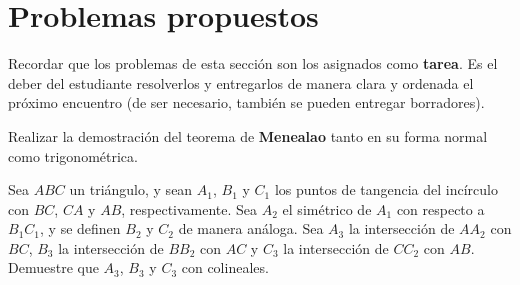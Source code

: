 \section{Problemas propuestos}

Recordar que los problemas de esta sección son los asignados como \textbf{tarea}.
Es el deber del estudiante resolverlos y entregarlos de manera clara y ordenada el próximo encuentro
(de ser necesario, también se pueden entregar borradores).

\begin{section-exercise}
    Realizar la demostración del teorema de \textbf{Menealao} tanto en su forma normal como trigonométrica.
\end{section-exercise}

\begin{section-problem}
    Sea $ABC$ un triángulo, y sean $A_1$, $B_1$ y $C_1$ los puntos de tangencia del incírculo con $BC$, $CA$ y $AB$, respectivamente.
    Sea $A_2$ el simétrico de $A_1$ con respecto a $B_1 C_1$, y se definen $B_2$ y $C_2$ de manera análoga.
    Sea $A_3$ la intersección de $A A_2$ con $BC$, $B_3$ la intersección de $B B_2$ con $AC$ y $C_3$ la intersección de $C C_2$ con $AB$.
    Demuestre que $A_3$, $B_3$ y $C_3$ con colineales.
\end{section-problem}